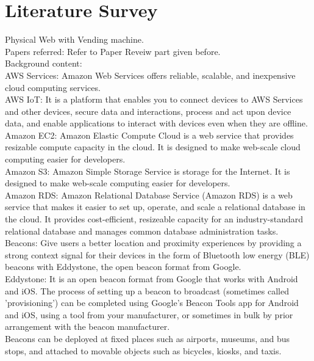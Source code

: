 \documentclass[oneside,a4paper,12pt]{report}
\begin{document}
\section{Literature Survey}
 Physical Web with Vending machine.\\
Papers referred: Refer to Paper Reveiw part given before.\\
Background content:\\
AWS Services: Amazon Web Services offers reliable, scalable, and inexpensive cloud computing services.\\
AWS IoT: It is a platform that enables you to connect devices to AWS Services and other devices, secure data and interactions, process and act upon device data, and enable applications to interact with devices even when they are offline.\\
Amazon EC2: Amazon Elastic Compute Cloud is a web service that provides resizable compute capacity in the cloud. It is designed to make web-scale cloud computing easier for developers.\\
Amazon S3: Amazon Simple Storage Service is storage for the Internet. It is designed to make web-scale computing easier for developers.\\
Amazon RDS: Amazon Relational Database Service (Amazon RDS) is a web service that makes it easier to set up, operate, and scale a relational database in the cloud. It provides cost-efficient, resizeable capacity for an industry-standard relational database and manages common database administration tasks. \\
Beacons:  Give users a better location and proximity experiences by providing a strong context signal for their devices in the form of Bluetooth low energy (BLE) beacons with Eddystone, the open beacon format from Google. \\
Eddystone: It is an open beacon format from Google that works with Android and iOS. The process of setting up a beacon to broadcast (sometimes called 'provisioning') can be completed using Google's Beacon Tools app for Android and iOS, using a tool from your manufacturer, or sometimes in bulk by prior arrangement with the beacon manufacturer. \\
Beacons can be deployed at fixed places such as airports, museums, and bus stops, and attached to movable objects such as bicycles, kiosks, and taxis.\\
\end{document}
